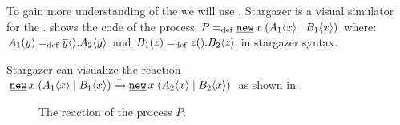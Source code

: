 To gain more understanding of the \picalc{} we will use  \cite{stargazer}. Stargazer is a visual simulator for the \picalc{}.  shows the code of the process $P\define\procres{x}{(\procpar{\proccall{A_1}{x}}{\proccall{B_1}{x}})}$ where: $A_1(y)=_{\mathrm{def}}{}\overline{y}\langle{}\rangle.A_2\langle y\rangle$ and $B_1(z)=_{\mathrm{def}}{}z({}).B_2\langle z\rangle$ in stargazer syntax.

\raggedbottom

Stargazer can visualize the reaction $\procres{x}{(\procpar{\proccall{A_1}{x}}{\proccall{B_1}{x}})} \transs{\tau} \procres{x}{(\procpar{\proccall{A_2}{x}}{\proccall{B_2}{x}})}$ as shown in
.
\begin{figure}[H]%
\centering
{}%
\hfill
{}%
\caption{The reaction of the process $P$.}
\label{pi_visualization_stargazer_reaction}%
\end{figure}